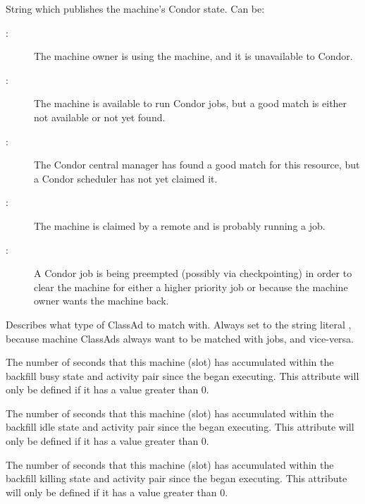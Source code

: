\begin{description}
%
\item[\AdAttr{State}:] String which publishes the machine's Condor state.
Can be:
	\begin{description}
	\item[:] The machine owner is using the machine, and
it is unavailable to Condor.
	\item[:] The machine is available to run Condor jobs,
but a good match is either not available or not 
yet found.
	\item[:] The Condor central manager has found a good
match for this resource, but a Condor scheduler has not yet claimed it.
	\item[:] The machine is claimed by a remote
 and is probably running a job.
	\item[:] A Condor job is being preempted (possibly
via checkpointing) in order to clear the machine for either a higher
priority job or because the machine owner wants the machine back.
	\end{description}   %
%
\item[\AdAttr{TargetType}:] Describes what type of ClassAd to match with.
Always set to the string literal , because machine ClassAds
always want to be matched with jobs, and vice-versa.
%
\item[\AdAttr{TotalTimeBackfillBusy}:] The number of seconds
that this machine (slot) has accumulated within the
backfill busy state and activity pair since the 
began executing.
This attribute will only be defined if it has a value greater than 0.
%
\item[\AdAttr{TotalTimeBackfillIdle}:] The number of seconds
that this machine (slot) has accumulated within the
backfill idle state and activity pair since the 
began executing.
This attribute will only be defined if it has a value greater than 0.
%
\item[\AdAttr{TotalTimeBackfillKilling}:] The number of seconds
that this machine (slot) has accumulated within the
backfill killing state and activity pair since the 
began executing.
This attribute will only be defined if it has a value greater than 0.
%

\end{description}
